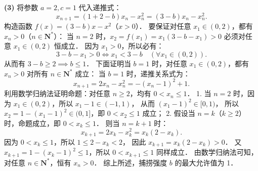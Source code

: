 \begin{answer}
\textbf{(3)}
将参数 $a = 2, c = 1$ 代入递推式：
\nopagebreak[4]
\[
x_{n+1} = (1 + 2 - b)x_n - x_n^2 = (3 - b)x_n - x_n^2.
\]
构造函数 $f(x) = (3 - b)x - x^2$（$x > 0$）．
要保证对任意 $x_1 \in (0, 2)$，都有 $x_n > 0$（$n \in \mathbf{N}^*$）：
当 $n = 2$ 时，$x_2 = f(x_1) = x_1(3 - b - x_1) > 0$ 必须对任意 $x_1 \in (0, 2)$ 恒成立．
因为 $x_1 > 0$，所以必有：
\nopagebreak[4]
\[
3 - b - x_1 > 0 \iff x_1 < 3 - b \quad (\forall x_1 \in (0, 2)).
\]
从而有 $3 - b \geqslant 2 \implies b \leqslant 1$．
下面证明当 $b = 1$ 时，对任意 $x_1 \in (0, 2)$，都有 $x_n > 0$ 对所有 $n \in \mathbf{N}^*$ 成立：
当 $b = 1$ 时，递推关系式为：
\nopagebreak[4]
\[
x_{n+1} = 2x_n - x_n^2 = -(x_n - 1)^2 + 1.
\]
利用数学归纳法证明命题：对任意 $n \geqslant 2$，均有 $0 < x_n \leqslant 1$．
1. 当 $n = 2$ 时，因为 $x_1 \in (0, 2)$，所以 $x_1 - 1 \in (-1, 1)$，
   从而 $(x_1 - 1)^2 \in [0, 1)$，
   所以 $x_2 = 1 - (x_1 - 1)^2 \in (0, 1]$，即 $0 < x_2 \leqslant 1$ 成立；
2. 假设当 $n = k$（$k \geqslant 2$）时，命题成立，即 $0 < x_k \leqslant 1$．
   则当 $n = k + 1$ 时：
\nopagebreak[4]
\[
x_{k+1} = 2x_k - x_k^2 = x_k(2 - x_k).
\]
   因为 $0 < x_k \leqslant 1$，所以 $1 \leqslant 2 - x_k < 2$，
   因此 $x_{k+1} = x_k(2 - x_k) > 0$．
   又 $x_{k+1} = 1 - (x_k - 1)^2 \leqslant 1$，所以 $0 < x_{k+1} \leqslant 1$ 同样成立．
由数学归纳法可知，对任意 $n \in \mathbf{N}^*$，恒有 $x_n > 0$．
综上所述，捕捞强度 $b$ 的最大允许值为 1．




\end{answer}
